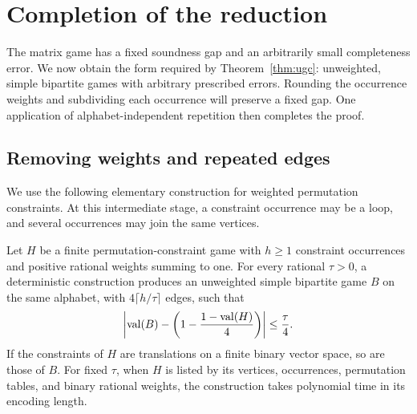 \section{Completion of the reduction}
\label{sec:finish}

The matrix game has a fixed soundness gap and an arbitrarily small
completeness error.  We now obtain the form required by
Theorem~\ref{thm:ugc}: unweighted, simple bipartite games with arbitrary
prescribed errors.  Rounding the occurrence weights and subdividing
each occurrence will preserve a fixed gap.  One application of
alphabet-independent repetition then completes the proof.

\subsection{Removing weights and repeated edges}

We use the following elementary construction for weighted permutation
constraints.  At this intermediate stage, a constraint occurrence may
be a loop, and several occurrences may join the same vertices.

\begin{lemma}
\label{lem:unweighted-subdivision}
Let $H$ be a finite permutation-constraint game with $h\ge1$
constraint occurrences and positive rational weights summing to one.
For every rational $\tau>0$, a deterministic construction produces an
unweighted simple bipartite game $B$ on the same alphabet, with
$4\lceil h/\tau\rceil$ edges, such that
\begin{equation}
 \left|\operatorname{val}(B)-\left(1-\frac{1-\operatorname{val}(H)}4\right)\right|
 \le\frac{\tau}{4}.
 \label{eq:rounded-subdivision-value}
\end{equation}
If the constraints of $H$ are translations on a finite binary vector
space, so are those of $B$.  For fixed $\tau$, when $H$ is listed by its
vertices, occurrences, permutation tables, and binary rational weights,
the construction takes polynomial time in its encoding length.
\end{lemma}

